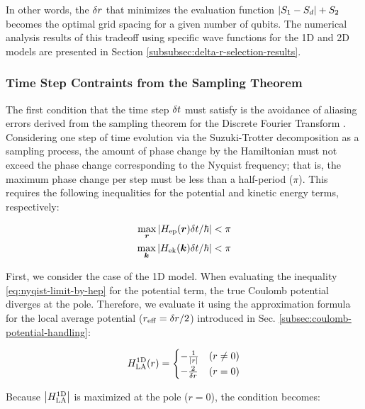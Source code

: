\documentclass[jctc-draft.tex]{subfiles}
\begin{document}
In other words, the $\delta r$ that minimizes the evaluation function ${\left| S_1 -
S_d \right|} + S_2$ becomes the optimal grid spacing for a given number of qubits. The
numerical analysis results of this tradeoff using specific wave functions for
the 1D and 2D models are presented in Section
\ref{subsubsec:delta-r-selection-results}.

\subsubsection{Time Step Contraints from the Sampling Theorem}

\label{subsubsec:time-step-constraints-from-sampling-theorem}

The first condition that the time step $\delta t$ must satisfy is the avoidance
of aliasing errors derived from the sampling theorem for the Discrete Fourier
Transform \cite{FEIT1982412}. Considering one step of time evolution via the
Suzuki-Trotter decomposition as a sampling process, the amount of phase change
by the Hamiltonian must not exceed the phase change corresponding to the Nyquist
frequency; that is, the maximum phase change per step must be less than a
half-period ($\pi$). This requires the following inequalities for the potential
and kinetic energy terms, respectively:

\begin{align}
\max_{\bm{r}}{\left| H_{\mathrm{ep}}(\bm{r})\delta t/\hbar \right|} < \pi \label{eq:nyqist-limit-by-hep}\\
\max_{\bm{k}}{\left| H_{\mathrm{ek}}(\bm{k})\delta t/\hbar \right|} < \pi \label{eq:nyqist-limit-by-hek}
\end{align}

First, we consider the case of the 1D model. When evaluating the inequality
\eqref{eq:nyqist-limit-by-hep} for the potential term, the true Coulomb
potential diverges at the pole. Therefore, we evaluate it using the
approximation formula for the local average potential ($r_{\mathrm{eff}}=\delta r/2$)
introduced in Sec. \ref{subsec:coulomb-potential-handling}:

\begin{equation}
H_{\mathrm{LA}}^{\mathrm{1D}}(r) = \begin{cases}
-\frac{1}{{\left| r \right|}} & (r\neq0) \\
-\frac{2}{\delta r} & (r=0)
\end{cases}
\end{equation}

Because ${\left| H_{\mathrm{LA}}^{\mathrm{1D}} \right|}$ is maximized at the pole ($r=0$), the condition becomes:
\end{document}
